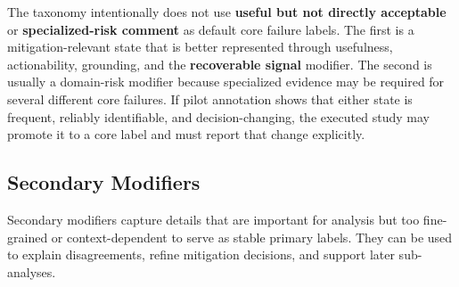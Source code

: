 \documentclass[10pt]{article}
\begin{document}
The taxonomy intentionally does not use \textbf{useful but not directly acceptable} or \textbf{specialized-risk comment} as default core failure labels. The first is a mitigation-relevant state that is better represented through usefulness, actionability, grounding, and the \textbf{recoverable signal} modifier. The second is usually a domain-risk modifier because specialized evidence may be required for several different core failures. If pilot annotation shows that either state is frequent, reliably identifiable, and decision-changing, the executed study may promote it to a core label and must report that change explicitly.

\subsection{Secondary Modifiers}

Secondary modifiers capture details that are important for analysis but too fine-grained or context-dependent to serve as stable primary labels. They can be used to explain disagreements, refine mitigation decisions, and support later sub-analyses.
\end{document}
